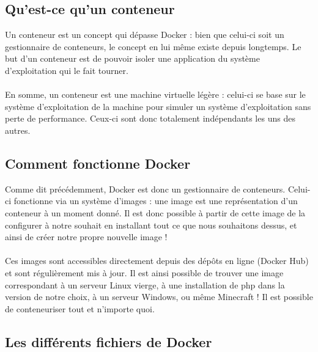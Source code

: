 \documentclass{article}
\begin{document}
    \subsection{Qu'est-ce qu'un conteneur}
    Un conteneur est un concept qui dépasse Docker : bien que celui-ci soit un gestionnaire de conteneurs, le concept en lui même existe depuis longtemps. Le but d'un conteneur est de pouvoir isoler une application du système d'exploitation qui le fait tourner.\\ \\
    \indent En somme, un conteneur est une machine virtuelle légère : celui-ci se base sur le système d'exploitation de la machine pour simuler un système d'exploitation sans perte de performance. Ceux-ci sont donc totalement indépendants les uns des autres.

    \subsection{Comment fonctionne Docker}
    Comme dit précédemment, Docker est donc un gestionnaire de conteneurs. Celui-ci fonctionne via un système d'images : une image est une représentation d'un conteneur à un moment donné. Il est donc possible à partir de cette image de la configurer à notre souhait en installant tout ce que nous souhaitons dessus, et ainsi de créer notre propre nouvelle image ! \\ \\
    \indent Ces images sont accessibles directement depuis des dépôts en ligne (Docker Hub) et sont régulièrement mis à jour. Il est ainsi possible de trouver une image correspondant à un serveur Linux vierge, à une installation de php dans la version de notre choix, à un serveur Windows, ou même Minecraft ! Il est possible de conteneuriser tout et n'importe quoi.

    \subsection{Les différents fichiers de Docker}
\end{document}
